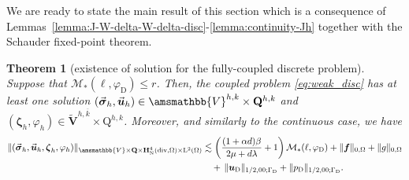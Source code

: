 \documentclass[fleqn,a4paper]{cas-sc}
\newcommand\vdiv{\mathop{\mathrm{div}}\nolimits}
\newcommand{\bu}{\boldsymbol{u}}
\newcommand{\ff}{\boldsymbol{f}}
\newcommand{\bzeta}{\boldsymbol{\zeta}}
\newcommand{\0}{\boldsymbol{0}}
\newcommand\bQ{\mathbf{Q}}
\newcommand\bV{\mathbf{V}}
\newcommand\rQ{\mathrm{Q}}
\newcommand\bbV{\amsmathbb{V}}
\newcommand\bH{\mathbf{H}}
\newcommand\rL{\mathrm{L}}
\newcommand\bsigma{\boldsymbol{\sigma}}
\numberwithin{equation}{section}
\numberwithin{figure}{section}
\newtheorem{theorem}{Theorem}[section]
\begin{document}
We are ready to state the main result of this section which is a consequence of Lemmas~\ref{lemma:J-W-delta-W-delta-disc}-\ref{lemma:continuity-Jh} together with the Schauder fixed-point theorem.
\begin{theorem}[existence of solution for the fully-coupled discrete problem]\label{th:J-solvability-fixed-disc}
 Suppose that {$\mathcal{M}_*(\ell, \varphi_{\mathrm{D}})\leq r$}.  Then, the coupled problem \eqref{eq:weak_disc} has at least one solution $(\vec{\bsigma}_h, \vec{\bu}_h) \in \bbV^{h,k} \times \bQ^{h,k}$ and $(\bzeta_h,\varphi_h) \in  \widetilde{\bV}^{h,\overline{k}} \times \rQ^{h,k}$. Moreover, and similarly to the continuous case, we have 
\begin{align*}
    \|(\vec{\bsigma}_h, \vec{\bu}_h, \bzeta_h, \varphi_h)\|_{\bbV \times \bQ \times \bH^4_{\mathrm{N}}(\vdiv,\Omega)\times \rL^2(\Omega)}  &  \lesssim \left(\frac{(1+\alpha d)\beta}{2\mu + d\lambda}+ 1\right){\mathcal{M}_*(\ell, \varphi_{\mathrm{D}})} +  \|\ff\|_{0,\Omega}  + \|g\|_{0,\Omega} \notag\\
    &\quad +\, \|\bu_{\mathrm{D}}\|_{1/2,00;\Gamma_{\mathrm{D}}} +  \|p_{\mathrm{D}}\|_{1/2,00;\Gamma_{\mathrm{D}}} . %
\end{align*}
\end{theorem}
\end{document}
